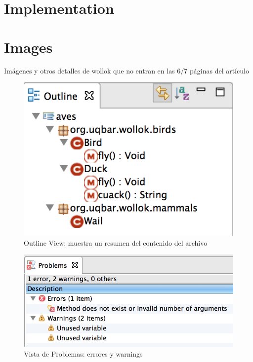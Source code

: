 \section{Implementation}
\label{sec:implementation}

\section{Images}
Imágenes y otros detalles de wollok que no entran en las 6/7 páginas del artículo

	\begin{figure}[p]
	    \centering
		\includegraphics[scale=0.5]{images/wollok-paper-outline.png}
	    \caption{Outline View: muestra un resumen del contenido del archivo}
	    \label{fig:outline.png}
	\end{figure}
	
	\begin{figure}[p]
	    \centering
		\includegraphics[scale=0.5]{images/wollok-paper-check-problemsview.png}
	    \caption{Vista de Problemas: errores y warnings}
	    \label{fig:problemsview.png}
	\end{figure}
	
